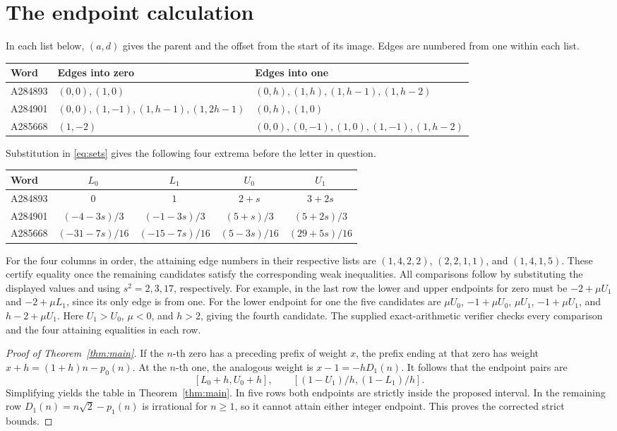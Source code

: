 \documentclass[11pt]{article}
\begin{document}
\section{The endpoint calculation}
In each list below, $(a,d)$ gives the parent and the offset from the start
of its image. Edges are numbered from one within each list.
\begin{center}\small
\begin{tabular}{@{}lll@{}}
\toprule
Word & Edges into zero & Edges into one\\
\midrule
A284893 & $(0,0),(1,0)$ & $(0,h),(1,h),(1,h-1),(1,h-2)$\\
A284901 & $(0,0),(1,-1),(1,h-1),(1,2h-1)$ & $(0,h),(1,0)$\\
A285668 & $(1,-2)$ & $(0,0),(0,-1),(1,0),(1,-1),(1,h-2)$\\
\bottomrule
\end{tabular}
\end{center}
Substitution in \eqref{eq:sets} gives the following four extrema before
the letter in question.
\begin{center}\small
\begin{tabular}{@{}lcccc@{}}
\toprule
Word & $L_0$ & $L_1$ & $U_0$ & $U_1$\\
\midrule
A284893 & $0$ & $1$ & $2+s$ & $3+2s$\\
A284901 & $(-4-3s)/3$ & $(-1-3s)/3$ & $(5+s)/3$ & $(5+2s)/3$\\
A285668 & $(-31-7s)/16$ & $(-15-7s)/16$ & $(5-3s)/16$ & $(29+5s)/16$\\
\bottomrule
\end{tabular}
\end{center}
For the four columns in order, the attaining edge numbers in their
respective lists are $(1,4,2,2)$, $(2,2,1,1)$, and $(1,4,1,5)$.
These certify equality once the remaining candidates satisfy the
corresponding weak inequalities. All comparisons follow by substituting
the displayed values and using $s^2=2,3,17$, respectively. For example, in
the last row the lower and upper endpoints for zero must be
$-2+\mu U_1$ and $-2+\mu L_1$, since its only edge is from one. For the
lower endpoint for one the five candidates are
$\mu U_0$, $-1+\mu U_0$, $\mu U_1$, $-1+\mu U_1$, and $h-2+\mu U_1$.
Here $U_1>U_0$, $\mu<0$, and $h>2$, giving the fourth candidate.
The supplied exact-arithmetic verifier checks every comparison and the
four attaining equalities in each row.

\begin{proof}[Proof of Theorem~\ref{thm:main}]
If the $n$-th zero has a preceding prefix of weight $x$, the prefix
ending at that zero has weight $x+h=(1+h)n-p_0(n)$. At the $n$-th
one, the analogous weight is $x-1=-hD_1(n)$. It follows that the endpoint
pairs are
\[
 [L_0+h,U_0+h],\qquad [(1-U_1)/h,(1-L_1)/h].
\]
Simplifying yields the table in Theorem~\ref{thm:main}. In five rows both
endpoints are strictly inside the proposed interval. In the remaining
row $D_1(n)=n\sqrt2-p_1(n)$ is irrational for $n\ge1$, so it cannot
attain either integer endpoint. This proves the corrected strict bounds.
\end{proof}
\end{document}
